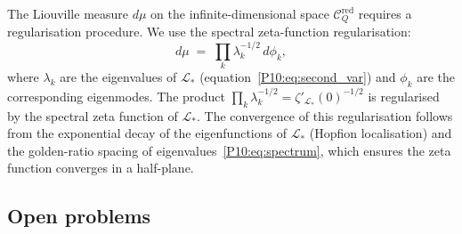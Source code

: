 \documentclass[11pt,a4paper]{article}
\theoremstyle{definition}
\theoremstyle{remark}
\newcommand{\CQr}{\mathcal{C}_Q^{\mathrm{red}}}
\newcommand{\dmu}{d\mu}
\begin{document}
The Liouville measure $\dmu$ on the infinite-dimensional space $\CQr$
requires a regularisation procedure.
We use the spectral zeta-function regularisation:
\begin{equation}
  \dmu \;=\; \prod_k \lambda_k^{-1/2}\,d\phi_k,
  \label{P10:eq:regularised_measure}
\end{equation}
where $\lambda_k$ are the eigenvalues of $\mathcal{L}_*$
(equation~\eqref{P10:eq:second_var}) and $\phi_k$ are the corresponding
eigenmodes.
The product $\prod_k\lambda_k^{-1/2} = \zeta'_{\mathcal{L}_*}(0)^{-1/2}$
is regularised by the spectral zeta function of $\mathcal{L}_*$.
The convergence of this regularisation follows from the exponential
decay of the eigenfunctions of $\mathcal{L}_*$ (Hopfion localisation)
and the golden-ratio spacing of eigenvalues~\eqref{P10:eq:spectrum},
which ensures the zeta function converges in a half-plane.

\subsection{Open problems}
\label{P10:sec:open}
\end{document}
